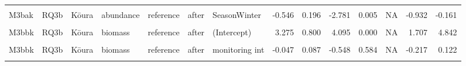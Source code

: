 \documentclass[
  12pt,
  a4paper,
  oneside]{scrbook}
\begin{document}
\begin{landscape}
\begin{longtable}[t]{lllllllrrrrrrr}
\cellcolor{gray!8}{M3bak} & \cellcolor{gray!8}{RQ3b} & \cellcolor{gray!8}{Kōura} & \cellcolor{gray!8}{abundance} & \cellcolor{gray!8}{reference} & \cellcolor{gray!8}{after} & \cellcolor{gray!8}{SeasonSummer} & \cellcolor{gray!8}{-0.330} & \cellcolor{gray!8}{0.233} & \cellcolor{gray!8}{-1.416} & \cellcolor{gray!8}{0.157} & \cellcolor{gray!8}{NA} & \cellcolor{gray!8}{-0.787} & \cellcolor{gray!8}{0.127}\\
M3bak & RQ3b & Kōura & abundance & reference & after & SeasonWinter & -0.546 & 0.196 & -2.781 & 0.005 & NA & -0.932 & -0.161\\
\addlinespace
\cellcolor{gray!8}{M3bak} & \cellcolor{gray!8}{RQ3b} & \cellcolor{gray!8}{Kōura} & \cellcolor{gray!8}{abundance} & \cellcolor{gray!8}{reference} & \cellcolor{gray!8}{after} & \cellcolor{gray!8}{Site type detailReference 2:monitoring int} & \cellcolor{gray!8}{-0.069} & \cellcolor{gray!8}{0.088} & \cellcolor{gray!8}{-0.787} & \cellcolor{gray!8}{0.431} & \cellcolor{gray!8}{0.797} & \cellcolor{gray!8}{-0.241} & \cellcolor{gray!8}{0.103}\\
M3bbk & RQ3b & Kōura & biomass & reference & after & (Intercept) & 3.275 & 0.800 & 4.095 & 0.000 & NA & 1.707 & 4.842\\
\cellcolor{gray!8}{M3bbk} & \cellcolor{gray!8}{RQ3b} & \cellcolor{gray!8}{Kōura} & \cellcolor{gray!8}{biomass} & \cellcolor{gray!8}{reference} & \cellcolor{gray!8}{after} & \cellcolor{gray!8}{Site type detailReference 2} & \cellcolor{gray!8}{-0.067} & \cellcolor{gray!8}{0.670} & \cellcolor{gray!8}{-0.100} & \cellcolor{gray!8}{0.920} & \cellcolor{gray!8}{NA} & \cellcolor{gray!8}{-1.379} & \cellcolor{gray!8}{1.245}\\
M3bbk & RQ3b & Kōura & biomass & reference & after & monitoring int & -0.047 & 0.087 & -0.548 & 0.584 & NA & -0.217 & 0.122\\
\cellcolor{gray!8}{M3bbk} & \cellcolor{gray!8}{RQ3b} & \cellcolor{gray!8}{Kōura} & \cellcolor{gray!8}{biomass} & \cellcolor{gray!8}{reference} & \cellcolor{gray!8}{after} & \cellcolor{gray!8}{Site type detailReference 2:monitoring int} & \cellcolor{gray!8}{-0.074} & \cellcolor{gray!8}{0.125} & \cellcolor{gray!8}{-0.591} & \cellcolor{gray!8}{0.554} & \cellcolor{gray!8}{0.797} & \cellcolor{gray!8}{-0.319} & \cellcolor{gray!8}{0.171}\\*

\end{longtable}

\endgroup{}
\end{landscape}
\end{document}

